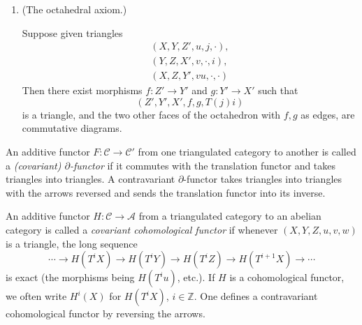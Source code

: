 \begin{definition*}
\begin{enumerate}
	\item[\textbf{(TR4)}] \begin{minipage}[t]{\linewidth}
	(The octahedral axiom.)
	\begin{center}
	\end{center}
	\end{minipage}

	Suppose given triangles
	\[
	\begin{gathered}
		(X,Y,Z',u,j,\cdot),\\
		(Y,Z,X',v,\cdot,i),\\
		(X,Z,Y',vu,\cdot,\cdot)
	\end{gathered}
	\]
	Then there exist morphisms $f\colon Z'\to Y'$ and $g\colon Y'\to X'$ such that
	\[
	(Z',Y',X',f,g,T(j)i)
	\]
	is a triangle, and the two other faces of the octahedron with $f,g$ as edges, are commutative diagrams.
\end{enumerate}
\end{definition*}

\begin{definition*}
	An additive functor $F\colon \mathcal{C}\to\mathcal{C}'$ from one triangulated category to another is called a \emph{(covariant) $\partial$-functor} if it commutes with the translation functor and takes triangles into triangles. A contravariant $\partial$-functor takes triangles into triangles with the arrows reversed and sends the translation functor into its inverse.
\end{definition*}

\begin{definition*}
	\begingroup\setlength{\emergencystretch}{2em}
An additive functor $H\colon \mathcal{C}\to\mathcal{A}$ from a triangulated category to an abelian category is called a \emph{covariant cohomological functor} if whenever $(X,Y,Z,u,v,w)$ is a triangle, the long sequence
	\[
	\cdots\to H(T^iX)\to H(T^iY)\to H(T^iZ)\to H(T^{i+1}X)\to\cdots
	\]
	is exact (the morphisms being $H(T^iu)$, etc.). If $H$ is a cohomological functor, we often write $H^i(X)$ for $H(T^iX)$, $i\in\mathbb{Z}$. One defines a contravariant cohomological functor by reversing the arrows.
\end{definition*}\par\endgroup


